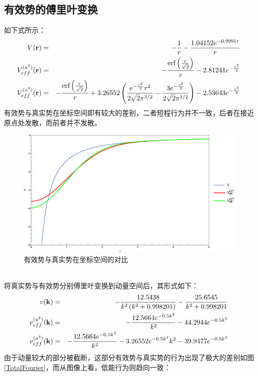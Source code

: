 \documentclass[hyperref,cs4size,titlepage,twoside]{ctexart}
\begin{document}
\subsection{有效势的傅里叶变换}
如下式所示：
\begin{eqnarray}
  V(\vb{r}) &=& -\frac{1}{r}-\frac{1.04152 e^{-0.9991 r}}{r} \\
  V_{eff}^{(a^2)}(\vb{r}) &=& -\frac{\text{erf}\left(\frac{r}{\sqrt{2}}\right)}{r}-2.81241 e^{-\frac{r^2}{2}} \\
  V_{eff}^{(a^4)}(\vb{r}) &=& -\frac{\text{erf}\left(\frac{r}{\sqrt{2}}\right)}{r}+3.26552 \left(\frac{e^{-\frac{r^2}{2}} r^2}{2 \sqrt{2} \pi ^{3/2}}-\frac{3 e^{-\frac{r^2}{2}}}{2 \sqrt{2} \pi ^{3/2}}\right)-2.53643 e^{-\frac{r^2}{2}}
\end{eqnarray}
有效势与真实势在坐标空间即有较大的差别，二者短程行为并不一致，后者在接近原点处发散，而前者并不发散。
\begin{figure}[!htbp]
  \centering
  \includegraphics[width=6in]{NoFourierTransformation.eps}
  \caption{有效势与真实势在坐标空间的对比}
\end{figure}\\
将真实势与有效势分别傅里叶变换到动量空间后，其形式如下：
\begin{eqnarray}
  v(\vb{k}) &=& -\frac{12.5438}{k^2 \left(k^2+0.998201\right)}-\frac{25.6545}{k^2+0.998201} \\
  v_{eff}^{(a^2)}(\vb{k}) &=& -\frac{12.5664 e^{-0.5 k^2}}{k^2} -44.2944 e^{-0.5 k^2} \\
  v_{eff}^{(a^4)}(\vb{k}) &=& -\frac{12.5664 e^{-0.5 k^2}}{k^2}-3.26552 e^{-0.5 k^2} k^2-39.9477 e^{-0.5 k^2}
\end{eqnarray}
由于动量较大的部分被截断，这部分有效势与真实势的行为出现了极大的差别如图\ref{TotalFourier}，而从图像上看，低能行为则趋向一致：
\end{document}
